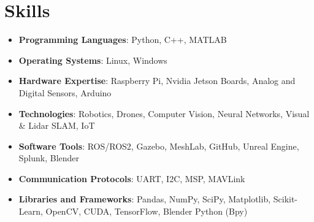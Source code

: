 \documentclass[a4paper,10pt]{article}
\begin{document}
\section*{Skills}
\begin{itemize}
    \item \textbf{Programming Languages}: Python, C++, MATLAB
    \item \textbf{Operating Systems}: Linux, Windows
    \item \textbf{Hardware Expertise}: Raspberry Pi, Nvidia Jetson Boards, Analog and Digital Sensors, Arduino
    \item \textbf{Technologies}: Robotics, Drones, Computer Vision, Neural Networks, Visual \& Lidar SLAM, IoT
    \item \textbf{Software Tools}: ROS/ROS2, Gazebo, MeshLab, GitHub, Unreal Engine, Splunk, Blender
    \item \textbf{Communication Protocols}: UART, I2C, MSP, MAVLink 
    \item \textbf{Libraries and Frameworks}: Pandas, NumPy, SciPy, Matplotlib, Scikit-Learn, OpenCV, CUDA, TensorFlow, Blender Python (Bpy)
\end{itemize}
\end{document}
